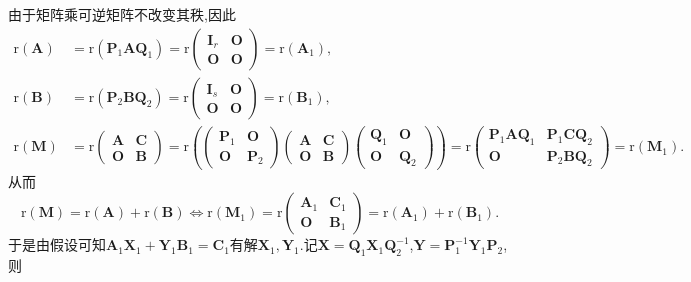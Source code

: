 \documentclass[../../main.tex]{subfiles}
\begin{document}
\begin{note}
由于矩阵乘可逆矩阵不改变其秩,因此
\begin{align*}
\mathrm{r}(\boldsymbol{A})&=\mathrm{r}(\boldsymbol{P}_1\boldsymbol{AQ}_1)=\mathrm{r}\begin{pmatrix}
\boldsymbol{I}_r & \boldsymbol{O} \\
\boldsymbol{O} & \boldsymbol{O}
\end{pmatrix}=\mathrm{r}(\boldsymbol{A}_1),\\
\mathrm{r}(\boldsymbol{B})&=\mathrm{r}(\boldsymbol{P}_2\boldsymbol{BQ}_2)=\mathrm{r}\begin{pmatrix}
\boldsymbol{I}_s & \boldsymbol{O} \\
\boldsymbol{O} & \boldsymbol{O}
\end{pmatrix}=\mathrm{r}(\boldsymbol{B}_1),\\
\mathrm{r}(\boldsymbol{M})&=\mathrm{r}\begin{pmatrix}
\boldsymbol{A} & \boldsymbol{C} \\
\boldsymbol{O} & \boldsymbol{B}
\end{pmatrix}=\mathrm{r}\left(\begin{pmatrix}
\boldsymbol{P}_1 & \boldsymbol{O} \\
\boldsymbol{O} & \boldsymbol{P}_2
\end{pmatrix}\begin{pmatrix}
\boldsymbol{A} & \boldsymbol{C} \\
\boldsymbol{O} & \boldsymbol{B}
\end{pmatrix}\begin{pmatrix}
\boldsymbol{Q}_1 & \boldsymbol{O} \\
\boldsymbol{O} & \boldsymbol{Q}_2
\end{pmatrix}\right)
=\mathrm{r}\begin{pmatrix}
\boldsymbol{P}_1\boldsymbol{AQ}_1 & \boldsymbol{P}_1\boldsymbol{CQ}_2 \\
\boldsymbol{O} & \boldsymbol{P}_2\boldsymbol{BQ}_2
\end{pmatrix}=\mathrm{r}(\boldsymbol{M}_1).
\end{align*}
从而
\[
\mathrm{r}(\boldsymbol{M})=\mathrm{r}(\boldsymbol{A})+\mathrm{r}(\boldsymbol{B})\Leftrightarrow\mathrm{r}(\boldsymbol{M}_1)=\mathrm{r}\begin{pmatrix}
\boldsymbol{A}_1 & \boldsymbol{C}_1 \\
\boldsymbol{O} & \boldsymbol{B}_1
\end{pmatrix}=\mathrm{r}(\boldsymbol{A}_1)+\mathrm{r}(\boldsymbol{B}_1).
\]
于是由假设可知\(\boldsymbol{A}_1\boldsymbol{X}_1+\boldsymbol{Y}_1\boldsymbol{B}_1=\boldsymbol{C}_1\)有解\(\boldsymbol{X}_1,\boldsymbol{Y}_1\).记\(\boldsymbol{X}=\boldsymbol{Q}_1\boldsymbol{X}_1\boldsymbol{Q}_{2}^{-1}\),\(\boldsymbol{Y}=\boldsymbol{P}_{1}^{-1}\boldsymbol{Y}_1\boldsymbol{P}_2\),则

\end{note}
\end{document}
